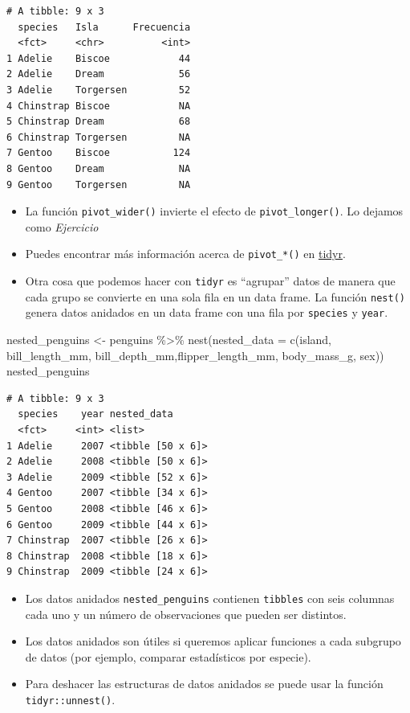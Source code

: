 \documentclass[
  letterpaper,
  DIV=11,
  numbers=noendperiod]{scrreprt}
\newenvironment{Shaded}{\begin{snugshade}}{\end{snugshade}}
\newcommand{\AttributeTok}[1]{\textcolor[rgb]{0.40,0.45,0.13}{#1}}
\newcommand{\FunctionTok}[1]{\textcolor[rgb]{0.28,0.35,0.67}{#1}}
\newcommand{\NormalTok}[1]{\textcolor[rgb]{0.00,0.23,0.31}{#1}}
\newcommand{\OtherTok}[1]{\textcolor[rgb]{0.00,0.23,0.31}{#1}}
\newcommand{\SpecialCharTok}[1]{\textcolor[rgb]{0.37,0.37,0.37}{#1}}
\begin{document}
\begin{verbatim}
# A tibble: 9 x 3
  species   Isla      Frecuencia
  <fct>     <chr>          <int>
1 Adelie    Biscoe            44
2 Adelie    Dream             56
3 Adelie    Torgersen         52
4 Chinstrap Biscoe            NA
5 Chinstrap Dream             68
6 Chinstrap Torgersen         NA
7 Gentoo    Biscoe           124
8 Gentoo    Dream             NA
9 Gentoo    Torgersen         NA
\end{verbatim}

\begin{itemize}
\item
  La función \texttt{pivot\_wider()} invierte el efecto de
  \texttt{pivot\_longer()}. Lo dejamos como {\emph{Ejercicio}}
\item
  Puedes encontrar más información acerca de \texttt{pivot\_*()} en
  \href{https://tidyr.tidyverse.org/articles/pivot.html}{tidyr}.
\item
  Otra cosa que podemos hacer con \texttt{tidyr} es ``agrupar'' datos de
  manera que cada grupo se convierte en una sola fila en un data frame.
  La función \texttt{nest()} genera datos anidados en un data frame con
  una fila por \texttt{species} y \texttt{year}.
\end{itemize}

\begin{Shaded}
\begin{Highlighting}[]
\NormalTok{nested\_penguins }\OtherTok{\textless{}{-}}\NormalTok{ penguins }\SpecialCharTok{\%\textgreater{}\%} 
    \FunctionTok{nest}\NormalTok{(}\AttributeTok{nested\_data =} 
           \FunctionTok{c}\NormalTok{(island, bill\_length\_mm, }
\NormalTok{             bill\_depth\_mm,flipper\_length\_mm,}
\NormalTok{             body\_mass\_g, sex))}
\NormalTok{nested\_penguins}
\end{Highlighting}
\end{Shaded}

\begin{verbatim}
# A tibble: 9 x 3
  species    year nested_data      
  <fct>     <int> <list>           
1 Adelie     2007 <tibble [50 x 6]>
2 Adelie     2008 <tibble [50 x 6]>
3 Adelie     2009 <tibble [52 x 6]>
4 Gentoo     2007 <tibble [34 x 6]>
5 Gentoo     2008 <tibble [46 x 6]>
6 Gentoo     2009 <tibble [44 x 6]>
7 Chinstrap  2007 <tibble [26 x 6]>
8 Chinstrap  2008 <tibble [18 x 6]>
9 Chinstrap  2009 <tibble [24 x 6]>
\end{verbatim}

\begin{itemize}
\item
  Los datos anidados \texttt{nested\_penguins} contienen
  \texttt{tibbles} con seis columnas cada uno y un número de
  observaciones que pueden ser distintos.
\item
  Los datos anidados son útiles si queremos aplicar funciones a cada
  subgrupo de datos (por ejemplo, comparar estadísticos por especie).
\item
  Para deshacer las estructuras de datos anidados se puede usar la
  función \texttt{tidyr::unnest()}.
\end{itemize}
\end{document}
